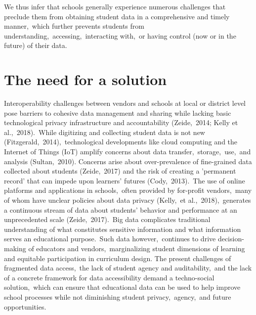 \documentclass{article}
\begin{document}
We thus infer that schools generally experience numerous challenges that preclude them from obtaining student data in a comprehensive and timely manner,\ which further prevents students from understanding,\ accessing,\ interacting with,\ or having control (now or in the future) of their data.\ 

\section{The need for a solution}

Interoperability challenges between vendors and schools at local or district level pose barriers to cohesive data management and sharing while lacking basic technological privacy infrastructure and accountability (Zeide,\ 2014; Kelly et al.,\ 2018).\ While digitizing and collecting student data is not new (Fitzgerald,\ 2014),\ technological developments like cloud computing and the Internet of Things (IoT) amplify concerns about data transfer,\ storage,\ use,\ and analysis (Sultan,\ 2010).
\bigbreak
Concerns arise about over-prevalence of fine-grained data collected about students (Zeide,\ 2017) and the risk of creating a 'permanent record' that can impede upon learners' futures (Cody,\ 2013).\ The use of online platforms and applications in schools,\ often provided by for-profit vendors,\ many of whom have unclear policies about data privacy (Kelly,\ et al.,\ 2018),\ generates a continuous stream of data about students' behavior and performance at an unprecedented scale (Zeide,\ 2017).\ Big data complicates traditional understanding of what constitutes sensitive information and what information serves an educational purpose.\ Such data however,\ continues to drive decision-making of educators and vendors,\ marginalizing student dimensions of learning and equitable participation in curriculum design.
\bigbreak
The present challenges of fragmented data access,\ the lack of student agency and auditability,\ and the lack of a concrete framework for data accessibility demand a techno-social solution,\ which can ensure that educational data can be used to help improve school processes while not diminishing student privacy,\ agency,\ and future opportunities.
\end{document}
